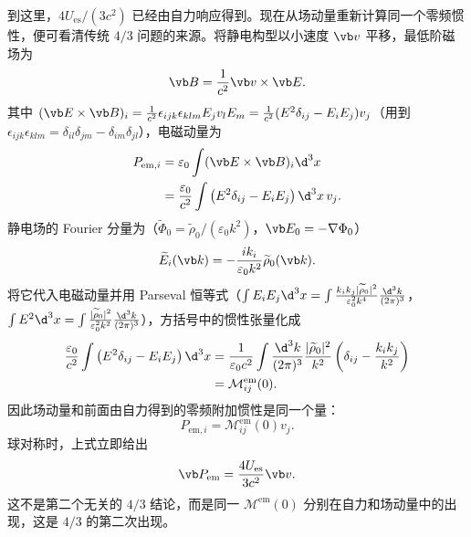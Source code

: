 到这里，$4U_{\mathrm{es}}/(3c^2)$ 已经由自力响应得到。现在从场动量重新计算同一个零频惯性，便可看清传统 $4/3$ 问题的来源。将静电构型以小速度 $\vb v$ 平移，最低阶磁场为
\begin{equation*}
 \vb B={1\over c^2}\vb v\times\vb E.
\end{equation*}
其中 $(\vb E\times\vb B)_i=\frac{1}{c^2}\epsilon_{ijk}\epsilon_{klm}E_jv_lE_m=\frac{1}{c^2}(E^2\delta_{ij}-E_iE_j)v_j$（用到 $\epsilon_{ijk}\epsilon_{klm}=\delta_{il}\delta_{jm}-\delta_{im}\delta_{jl}$），电磁动量为
\begin{align*}
 P_{\mathrm{em},i}
 &=\varepsilon_0\int(\vb E\times\vb B)_i\d^3x\\
 &={\varepsilon_0\over c^2}
 \int\left(E^2\delta_{ij}-E_iE_j\right)\d^3x\,v_j.
\end{align*}
静电场的 Fourier 分量为（$\widetilde\Phi_0=\widetilde\rho_0/(\varepsilon_0k^2)$，$\vb E_0=-\nabla\Phi_0$）
\begin{equation*}
 \widetilde E_i(\vb k)
 =-{ik_i\over\varepsilon_0k^2}\widetilde\rho_0(\vb k).
\end{equation*}
将它代入电磁动量并用 Parseval 恒等式（$\int E_iE_j\d^3x=\int\frac{k_ik_j|\widetilde\rho_0|^2}{\varepsilon_0^2k^4}\frac{\d^3k}{(2\pi)^3}$，$\int E^2\d^3x=\int\frac{|\widetilde\rho_0|^2}{\varepsilon_0^2k^2}\frac{\d^3k}{(2\pi)^3}$），方括号中的惯性张量化成
\begin{align*}
 {\varepsilon_0\over c^2}
 \int\left(E^2\delta_{ij}-E_iE_j\right)\d^3x
 &={1\over\varepsilon_0c^2}
 \int{\d^3k\over(2\pi)^3}
 {|\widetilde\rho_0|^2\over k^2}
 \left(\delta_{ij}-{k_i k_j\over k^2}\right)\\
 &=\mathcal M_{ij}^{\mathrm{em}}(0).
\end{align*}
因此场动量和前面由自力得到的零频附加惯性是同一个量：
\begin{equation*}
 P_{\mathrm{em},i}
 =\mathcal M_{ij}^{\mathrm{em}}(0)v_j.
\end{equation*}
球对称时，上式立即给出
\begin{equation*}
 \vb P_{\mathrm{em}}
 ={4U_{\mathrm{es}}\over3c^2}\vb v.
\end{equation*}
这不是第二个无关的 $4/3$ 结论，而是同一 $\mathcal M^{\mathrm{em}}(0)$ 分别在自力和场动量中的出现，这是 $4/3$ 的第二次出现。

